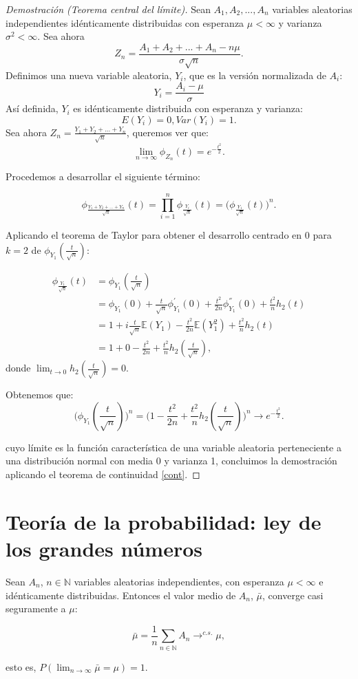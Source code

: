 \documentclass[../proyecto.tex]{memoir}
\begin{document}
\begin{proof}[Demostración (Teorema central del límite)]

Sean $A_{1},A_{2},...,A_{n}$ variables aleatorias independientes idénticamente distribuidas con esperanza $\mu < \infty$ y varianza $\sigma^2< \infty$.
Sea ahora $$
Z_{n} = \frac{A_{1}+A_{2}+...+A_{n}-n\mu }{\sigma \sqrt{n}}.
$$
Definimos una nueva variable aleatoria, $Y_i$, que es la versión normalizada de $A_i$:$$
Y_i=\frac{A_i-\mu}{\sigma}
$$
Así definida, $Y_i$ es idénticamente distribuida con esperanza y varianza: $$
E(Y_{i}) = 0,  Var(Y_{i})=1.
$$
Sea ahora $Z_n = \frac{Y_1+Y_2+...+Y_n}{\sqrt{n}}$, queremos ver que: $$
\lim_{n \to \infty} \phi_{Z_{n}}(t)=e^{-\frac{t^{2}}{2}}.
$$

Procedemos a desarrollar el siguiente término:

$$
\phi_{\frac{Y_1+Y_2+...+Y_n}{\sqrt{n}}}(t) = \prod_{i=1}^{n} \phi_{\frac{Y_i}{\sqrt{n}}} (t) = \big(\phi_{\frac{Y_1}{\sqrt{n}}}(t) \big)^n.
$$

Aplicando el teorema de Taylor para obtener el desarrollo centrado en 0 para $k=2$ de $\phi_{Y_1}(\frac{t}{\sqrt{n}})$: 

\begin{align*}
\phi_{\frac{Y_1}{\sqrt{n}}}(t) &= \phi_{Y_1}(\frac{t}{\sqrt{n}}) \\
  &= \phi_{Y_1}(0) + \frac{t}{\sqrt{n}}\phi_{Y_1}^{'}(0) + \frac{t^2}{2n}\phi_{Y_1}^{''}(0) + \frac{t^2}{n} h_2(t)\\
 &= 1 + i\frac{t}{\sqrt{n}}\mathds{E}(Y_1) - \frac{t^2}{2n}\mathds{E}(Y_1^2) + \frac{t^2}{n} h_2(t)\\
 &= 1 + 0 - \frac{t^2}{2n} + \frac{t^2}{n} h_2(\frac{t}{\sqrt{n}}),
\end{align*}
donde $\lim_{t\to 0} h_2(\frac{t}{\sqrt{n}}) = 0$.

Obtenemos que: $$
\big(\phi_{Y_1}(\frac{t}{\sqrt{n}}) \big)^n =\big( 1 - \frac{t^2}{2n} + \frac{t^2}{n} h_2(\frac{t}{\sqrt{n}}) \big)^n\longrightarrow e^{-\frac{t^2}{2}}.
$$

cuyo límite es la función característica de una variable aleatoria perteneciente a una distribución normal con media 0 y varianza 1, concluimos la demostración aplicando el teorema de continuidad \ref{cont}.
\end{proof}

\section{Teoría de la probabilidad: ley de los grandes números}
\begin{teorema} \label{teo_grandes_numeros}
Sean $A_n$, $n \in \mathds{N}$ variables aleatorias independientes, con esperanza $\mu < \infty$ e idénticamente distribuidas. Entonces el valor medio de $A_n$, $\bar{\mu}$, converge casi seguramente a $\mu$:

$$
\bar{\mu}=\frac{1}{n}\sum_{n\in\mathds{N}} A_n \to^{c.s.} \mu,
$$

esto es, $P(\lim_{n\to\infty} \bar{\mu}=\mu) = 1$.

\end{teorema}
\end{document}
